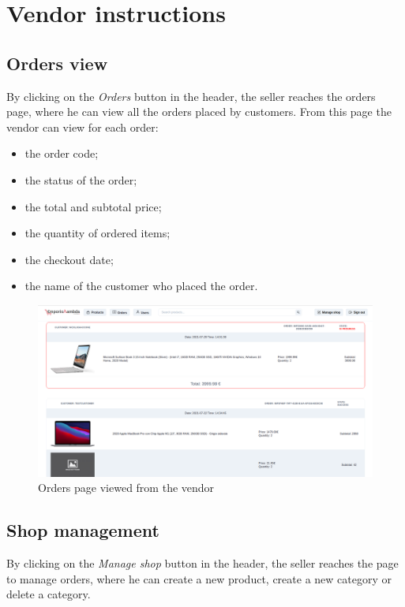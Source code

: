 \section{Vendor instructions}
\subsection{Orders view}
By clicking on the \textit{Orders} button in the header, the seller reaches the orders page, where he can view all the orders placed by customers.
\newline
From this page the vendor can view for each order:
\begin {itemize}
\item the order code;
\item the status of the order;
\item the total and subtotal price;
\item the quantity of ordered items;
\item the checkout date;
\item the name of the customer who placed the order.
\end {itemize}
\begin{figure}[!ht]
    \caption{Orders page viewed from the vendor}
    \vspace{5px}
    \includegraphics[scale=0.25]{../../../../Images/userManual/ordersVendor.png}
    \centering
\end{figure}
\pagebreak
\subsection{Shop management}
By clicking on the \textit{Manage shop} button in the header, the seller reaches the page to manage orders, where he can create a new product, create a new category or delete a category.
